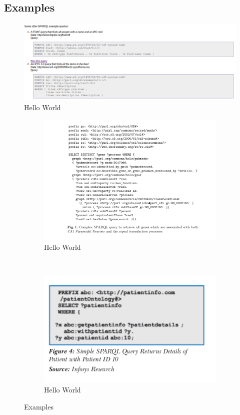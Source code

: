 \documentclass[DIV=calc, paper=a4, fontsize=12pt, onecolumn]{scrartcl}	 %
\begin{document}
  \subsection{Examples}
  \begin{figure}[h!]
    \includegraphics[trim=1 1 400 1,clip,scale=0.4]{sparql.png}
    \caption{Hello World}
    \label{fig:first}
  \end{figure}
  \begin{figure}[h!]
    \begin{subfigure}[b]{.5\linewidth}
      \includegraphics[width=1.0\textwidth]{sparql1.png}
      \caption{Hello World}
      \label{fig:second}
    \end{subfigure}
    ~
    \begin{subfigure}[b]{.5\linewidth}
      \includegraphics[width=1.0\textwidth]{sparqlh.png}
      \caption{Hello World}
      \label{fig:third}
    \end{subfigure}
    \caption{Examples}
    \label{fig:sparql_examples}
  \end{figure}
\end{document}
